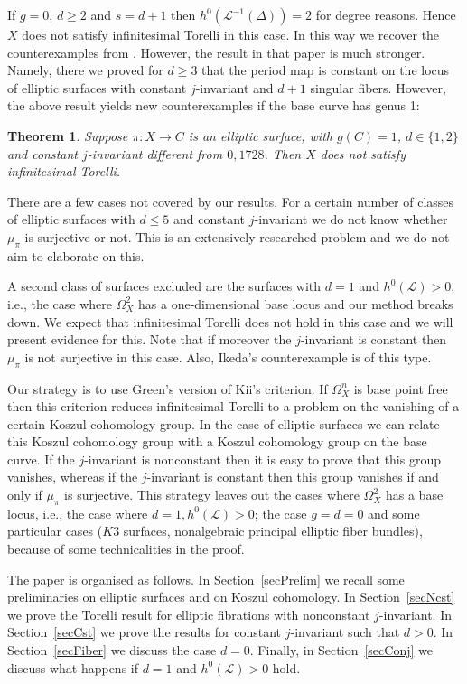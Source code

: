 \documentclass{amsart}
\newcommand{\cL}{\mathcal{L}}
\newtheorem{theorem}{Theorem}[section]
\theoremstyle{definition}
\theoremstyle{remark}
\begin{document}
If $g=0$, $d\geq 2$ and $s=d+1$ then  $h^0(\cL^{-1}(\Delta))=2$ for degree reasons. Hence $X$ does not satisfy infinitesimal Torelli in this case. In this way we recover the counterexamples from \cite{Ext}. However, the result in that paper is much stronger. Namely, there we proved for $d\geq 3$ that the period map is constant on the locus of elliptic surfaces with constant $j$-invariant and $d+1$ singular fibers. However, the above result yields new counterexamples if the base curve has genus 1:

\begin{theorem} Suppose $\pi:X\to C$ is an elliptic surface, with $g(C)=1$, $d\in \{1,2\}$ and constant $j$-invariant different from $0,1728$. Then $X$ does not satisfy infinitesimal Torelli.
\end{theorem}



There are a few cases not covered by our results. For a certain number of classes of elliptic surfaces with $d\leq 5$ and constant $j$-invariant we do not know whether  $\mu_\pi$ is surjective or not. This is an extensively researched problem and we do not aim to elaborate on this.

A second class of surfaces  excluded are the surfaces with $d=1$ and $h^0(\cL)>0$, i.e., the  case where $\Omega^2_X$ has a one-dimensional base locus and our method breaks down. We expect that infinitesimal Torelli does not hold in this case and we will present evidence for this. Note that if moreover the $j$-invariant is constant then $\mu_\pi$ is not surjective in this case.
Also, Ikeda's counterexample is of this type.


Our strategy is to use Green's version of Kii's criterion. If $\Omega^n_X$ is base point free then this criterion reduces infinitesimal Torelli to a problem on the vanishing of a certain Koszul cohomology group. In the case of elliptic surfaces we can relate this Koszul cohomology group with a Koszul cohomology group on the base curve. If the $j$-invariant is nonconstant then it is easy to prove that this group vanishes, whereas if the $j$-invariant is constant then this group vanishes if and only if $\mu_\pi$ is surjective. This strategy leaves out the cases where $\Omega^2_X$ has a base locus, i.e.,  the case where $d=1, h^0(\cL)>0$; the case $g=d=0$ and some particular cases ($K3$ surfaces, nonalgebraic principal elliptic fiber bundles), because of some technicalities in the proof.


The paper is organised as follows. 
In Section~\ref{secPrelim} we recall some preliminaries on elliptic surfaces and on Koszul cohomology. In Section~\ref{secNcst} we prove the Torelli result for elliptic fibrations with nonconstant $j$-invariant. In Section~\ref{secCst} we prove the results for constant $j$-invariant such that $d>0$. 
 In Section~\ref{secFiber} we discuss the case $d=0$. Finally, in Section~\ref{secConj} we discuss what happens if $d=1$ and $h^0(\cL)>0$ hold.
\end{document}
